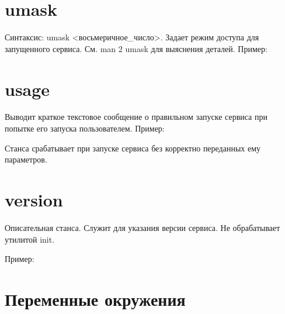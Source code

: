 \section{umask}
Синтаксис: umask <восьмеричное\_число>. Задает режим доступа для запущенного сервиса. См. man 2 umask для выяснения деталей. Пример: \begin{alltt}
\end{alltt}  
\section{usage}
Выводит краткое текстовое сообщение о правильном запуске сервиса при попытке его запуска пользователем. Пример: \begin{alltt}
\end{alltt}
Станса срабатывает при запуске сервиса без корректно переданных ему параметров.
\section{version}
Описательная станса. Служит для указания версии сервиса. Не обрабатывает утилитой init.

Пример: \begin{alltt}
\end{alltt}
\section{Переменные окружения} \label{sec:EnviromentVariables}